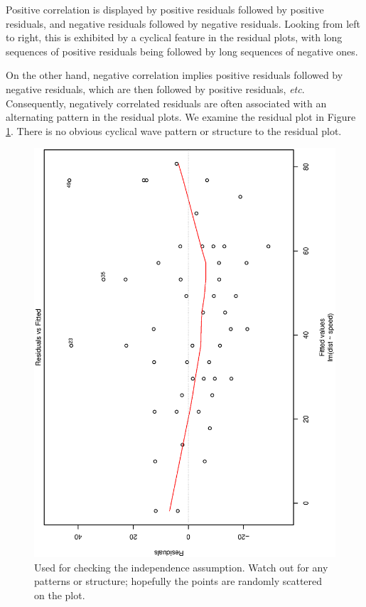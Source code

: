 \documentclass[captions=tableheading]{scrbook}
\begin{document}
Positive correlation is displayed by positive residuals followed by positive residuals, and negative residuals followed by negative residuals. Looking from left to right, this is exhibited by a cyclical feature in the residual plots, with long sequences of positive residuals being followed by long sequences of negative ones.

On the other hand, negative correlation implies positive residuals followed by negative residuals, which are then followed by positive residuals, \emph{etc}. Consequently, negatively correlated residuals are often associated with an alternating pattern in the residual plots. We examine the residual plot in Figure \ref{fig:resids-fitted-cars}. There is no obvious cyclical wave pattern or structure to the residual plot. 

\begin{figure}[th]
  \includegraphics[angle=270, totalheight=4in]{ps/resids-fitted-cars.ps}
  \caption[Plot of the residuals versus the fitted values for the \texttt{cars}
data]{\small Used for checking the independence assumption. Watch out for any patterns or structure; hopefully the points are randomly scattered on the plot.}
  \label{fig:resids-fitted-cars}
\end{figure}
\end{document}
